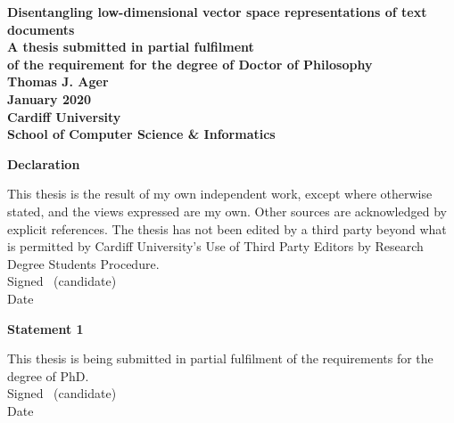 \documentclass[a4paper,oneside,onecolumn,openright,12pt]{book}
\begin{document}
\frontmatter


\begin{titlepage}

\begin{center}
\vspace*{3ex}
\textbf{\Huge Disentangling low-dimensional vector space representations of text documents}\\[2ex]
\textbf{\large A thesis submitted in partial fulfilment}\\[1ex]
\textbf{\large of the requirement for the degree of Doctor of
  Philosophy}\\[16ex]
\textbf{\LARGE Thomas J. Ager}\\
\vfill
\textbf{\LARGE January 2020}\\
\vfill
\textbf{\LARGE Cardiff University}\\[1ex]
\textbf{\LARGE School of Computer Science \& Informatics}\\[4ex]
\end{center}

\end{titlepage}
\newpage\thispagestyle{empty}\cleardoublepage


\thispagestyle{plain}

\textbf{\large Declaration}

This thesis is the result of my own independent work, except where otherwise stated,
and the views expressed are my own. Other sources are acknowledged by explicit references.
The thesis has not been edited by a third party beyond what is permitted by
Cardiff University's Use of Third Party Editors by Research Degree Students Procedure.\\[2ex]
Signed \dotfill \ (candidate) \hspace*{10em}\\[1ex]
Date\ \ \ \ \ \dotfill \hspace*{18em}

\vfill

\vfill

\textbf{\large Statement 1}

This thesis is being submitted in partial fulfilment of the requirements for the degree of PhD.\\[2ex]
Signed \dotfill \ (candidate) \hspace*{10em}\\[1ex]
Date\ \ \ \ \ \dotfill \hspace*{18em}
\end{document}

